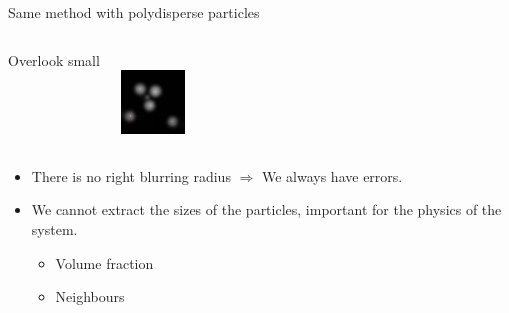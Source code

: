 \documentclass{beamer}
\begin{document}
\begin{frame}{Same method with polydisperse particles}
\begin{columns}[T]
	\centering
	{\strut{}Overlook small}\\
	\includegraphics[width=\textwidth]{dillute_smaller_blur1_5}
	\end{columns}
	\begin{itemize}
	\item There is no \alert{right} blurring radius $\Rightarrow$ We always have errors.
	\item We cannot extract the sizes of the particles, important for the physics of the system.
	\begin{itemize}
		\item Volume fraction
		\item Neighbours
	\end{itemize}
	\end{itemize}
\end{frame}
\end{document}
